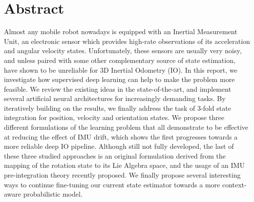 
 \setcounter{tocdepth}{2}
 \tableofcontents
 \cleardoublepage


 \listoffigures
 \clearpage




\chapter*{Abstract}

Almost any mobile robot nowadays is equipped with an Inertial Measurement Unit, an electronic sensor which provides high-rate observations of its acceleration and angular velocity states. 
Unfortunately, these sensors are usually very noisy, and unless paired with some other complementary source of state estimation, have shown to be unreliable for 3D Inertial Odometry (IO).
In this report, we investigate how supervised deep learning can help to make the problem more feasible.
We review the existing ideas in the state-of-the-art, and implement several artificial neural architectures for increasingly demanding tasks. 
By iteratively building on the results, we finally address the task of 3-fold state integration for position, velocity and orientation states.
We propose three different formulations of the learning problem that all demonstrate to be effective at reducing the effect of IMU drift, which shows the first progresses towards a more reliable deep IO pipeline. 
Although still not fully developed, the last of these three studied approaches is an original formulation derived from the mapping of the rotation state to its Lie Algebra space, and the usage of an IMU pre-integration theory recently proposed.
We finally propose several interesting ways to continue fine-tuning our current state estimator towards a more context-aware probabilistic model.
    
\cleardoublepage

